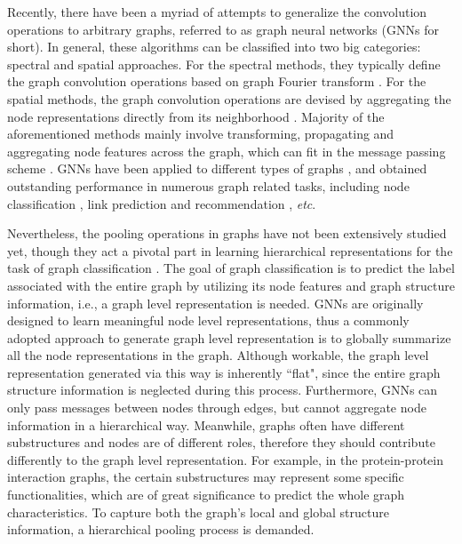 \documentclass[letterpaper]{article} \usepackage{aaai20}  \usepackage{times}  \usepackage{helvet} \usepackage{courier}  \usepackage[hyphens]{url}  \usepackage{graphicx} \urlstyle{rm} \def\UrlFont{\rm}  \usepackage{graphicx}  \frenchspacing  \setlength{\pdfpagewidth}{8.5in}  \setlength{\pdfpageheight}{11in}
\begin{document}
Recently, there have been a myriad of attempts to generalize the convolution operations to arbitrary graphs, referred to as graph neural networks (GNNs for short). In general, these algorithms can be classified into two big categories: spectral and spatial approaches. For the spectral methods, they typically define the graph convolution operations based on graph Fourier transform \cite{bruna2013spectral,defferrard2016convolutional,kipf2016semi}. For the spatial methods, the graph convolution operations are devised by aggregating the node representations directly from its neighborhood \cite{hamilton2017inductive,monti2017geometric,velivckovic2017graph,morris2019weisfeiler}. Majority of the aforementioned methods mainly involve transforming, propagating and aggregating node features across the graph, which can fit in the message passing scheme \cite{gilmer2017neural}. GNNs have been applied to different types of graphs \cite{velivckovic2017graph,derr2018signed}, and obtained outstanding performance in numerous graph related tasks, including node classification \cite{kipf2016semi}, link prediction \cite{schlichtkrull2018modeling,zhang2018anrl} and recommendation \cite{ying2018graph}, {\it etc}.

Nevertheless, the pooling operations in graphs have not been extensively studied yet, though they act a pivotal part in learning hierarchical representations for the task of graph classification \cite{ying2018hierarchical}. The goal of graph classification is to predict the label associated with the entire graph by utilizing its node features and graph structure information, i.e., a graph level representation is needed. GNNs are originally designed to learn meaningful node level representations, thus a commonly adopted approach to generate graph level representation is to globally summarize all the node representations in the graph. Although workable, the graph level representation generated via this way is inherently ``flat", since the entire graph structure information is neglected during this process. Furthermore, GNNs can only pass messages between nodes through edges, but cannot aggregate node information in a hierarchical way. Meanwhile, graphs often have different substructures and nodes are of different roles, therefore they should contribute differently to the graph level representation. For example, in the protein-protein interaction graphs, the certain substructures may represent some specific functionalities, which are of great significance to predict the whole graph characteristics. To capture both the graph's local and global structure information, a hierarchical pooling process is demanded.
\end{document}
